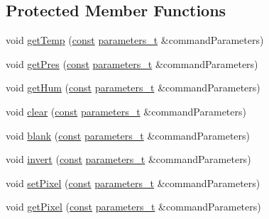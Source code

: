 \subsection*{Protected Member Functions}
\begin{DoxyCompactItemize}
\item 
void \hyperlink{class_m_q_t_tsense_h_a_t_a39ff54904e181f55b4242c800e60a95f}{get\+Temp} (\hyperlink{functions__c_8js_afacfd9c985d225bb07483b887a801b6f}{const} \hyperlink{_json_m_q_t_t_8h_ad3b3bd6544a775cf1e31cd71610c5765}{parameters\+\_\+t} \&command\+Parameters)
\item 
void \hyperlink{class_m_q_t_tsense_h_a_t_a30a58adadcb37aeccd992ca9458e17e1}{get\+Pres} (\hyperlink{functions__c_8js_afacfd9c985d225bb07483b887a801b6f}{const} \hyperlink{_json_m_q_t_t_8h_ad3b3bd6544a775cf1e31cd71610c5765}{parameters\+\_\+t} \&command\+Parameters)
\item 
void \hyperlink{class_m_q_t_tsense_h_a_t_ad61c2741b9e195b607bb8fe6ac9a3832}{get\+Hum} (\hyperlink{functions__c_8js_afacfd9c985d225bb07483b887a801b6f}{const} \hyperlink{_json_m_q_t_t_8h_ad3b3bd6544a775cf1e31cd71610c5765}{parameters\+\_\+t} \&command\+Parameters)
\item 
void \hyperlink{class_m_q_t_tsense_h_a_t_af05cb64126bd0591d5ca4bac5b48b111}{clear} (\hyperlink{functions__c_8js_afacfd9c985d225bb07483b887a801b6f}{const} \hyperlink{_json_m_q_t_t_8h_ad3b3bd6544a775cf1e31cd71610c5765}{parameters\+\_\+t} \&command\+Parameters)
\item 
void \hyperlink{class_m_q_t_tsense_h_a_t_a7736e041ad475ec82756223c90da547e}{blank} (\hyperlink{functions__c_8js_afacfd9c985d225bb07483b887a801b6f}{const} \hyperlink{_json_m_q_t_t_8h_ad3b3bd6544a775cf1e31cd71610c5765}{parameters\+\_\+t} \&command\+Parameters)
\item 
void \hyperlink{class_m_q_t_tsense_h_a_t_aac0a786db57adb1f70f4932bc3800cff}{invert} (\hyperlink{functions__c_8js_afacfd9c985d225bb07483b887a801b6f}{const} \hyperlink{_json_m_q_t_t_8h_ad3b3bd6544a775cf1e31cd71610c5765}{parameters\+\_\+t} \&command\+Parameters)
\item 
void \hyperlink{class_m_q_t_tsense_h_a_t_a2c2134187487882f89a850b6a7f010ec}{set\+Pixel} (\hyperlink{functions__c_8js_afacfd9c985d225bb07483b887a801b6f}{const} \hyperlink{_json_m_q_t_t_8h_ad3b3bd6544a775cf1e31cd71610c5765}{parameters\+\_\+t} \&command\+Parameters)
\item 
void \hyperlink{class_m_q_t_tsense_h_a_t_aac431239ec91b0c7647fc90f2780d5e3}{get\+Pixel} (\hyperlink{functions__c_8js_afacfd9c985d225bb07483b887a801b6f}{const} \hyperlink{_json_m_q_t_t_8h_ad3b3bd6544a775cf1e31cd71610c5765}{parameters\+\_\+t} \&command\+Parameters)

\end{DoxyCompactItemize}
